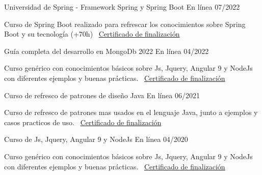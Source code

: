 \documentclass[]{awesome-cv}
\begin{document}
\begin{cventries}
	\cventry
	{}
	{Universidad de Spring - Framework Spring y Spring Boot \vspace{-4mm}}
	{En línea \vspace{-5mm}}
	{07/2022 \vspace{-5mm}}
	{\begin{cvsectionnormaltext} 
		\item{Curso de Spring Boot realizado para refrescar los conocimientos sobre Spring Boot y su tecnología (+70h)
		\newline \vspace{2mm} \faLink\ \href{https://www.udemy.com/certificate/UC-ee0ce349-6915-479b-b038-5253aba9d0d8/}{Certificado de finalización}}
	\end{cvsectionnormaltext}}
    {}

	\cventry
	{}
	{Guía completa del desarrollo en MongoDb 2022 \vspace{-4mm}}
	{En línea \vspace{-5mm}}
	{04/2022 \vspace{-5mm}}
	{\begin{cvsectionnormaltext} 
		\item{Curso genérico con conocimientos básicos sobre Js, Jquery, Angular 9 y NodeJs con diferentes ejemplos y buenas prácticas.
		\newline \vspace{2mm} \faLink\ \href{https://www.udemy.com/certificate/UC-b990e98a-9b76-44b1-8e3e-43b68213725c/}{Certificado de finalización}}
	\end{cvsectionnormaltext}}
    {}
    
	\cventry
	{}
	{Curso de refresco de patrones de diseño Java \vspace{-4mm}}
	{En línea \vspace{-5mm}}
	{06/2021 \vspace{-5mm}}
	{\begin{cvsectionnormaltext} 
		\item{Curso de refresco de patrones mas usados en el lenguaje Java, junto a ejemplos y casos practicos de uso.
		\newline \vspace{2mm} \faLink\ \href{https://www.udemy.com/certificate/UC-982e3338-ea7d-4434-bf27-af8e38b77bd5/}{Certificado de finalización}}
	\end{cvsectionnormaltext}}
    {}

    
	\cventry
	{}
	{Curso de Js, Jquery, Angular 9 y NodeJs \vspace{-4mm}}
	{En línea \vspace{-5mm}}
	{04/2020 \vspace{-5mm}}
	{\begin{cvsectionnormaltext} 
		\item{Curso genérico con conocimientos básicos sobre Js, Jquery, Angular 9 y NodeJs con diferentes ejemplos y buenas prácticas.
		\newline \vspace{2mm} \faLink\ \href{https://www.udemy.com/certificate/UC-012febdf-7657-4e65-8708-ee4e18d5a8e1/}{Certificado de finalización}}
	\end{cvsectionnormaltext}}
    {}
\end{cventries}
\end{document}
